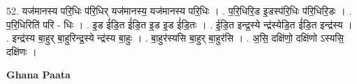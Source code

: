 \documentclass[17pt]{extarticle}
\begin{document}
52. यज॑मानस्य परि॒धिः प॑रि॒धिर् यज॑मानस्य॒ यज॑मानस्य परि॒धिः । . प॒रि॒धिरि॒ड इ॒डस्प॑रि॒धिः प॑रि॒धिरि॒डः । . प॒रि॒धिरिति॑ परि - धिः । . इ॒ड ई॑डि॒त ई॑डि॒त इ॒ड इ॒ड ई॑डि॒तः । . ई॒डि॒त इन्द्र॒स्ये न्द्र॑स्येडि॒त ई॑डि॒त इन्द्र॑स्य । . इन्द्र॑स्य बा॒हुर् बा॒हुरिन्द्र॒स्ये न्द्र॑स्य बा॒हुः । . बा॒हुर॑स्यसि बा॒हुर् बा॒हुर॑सि । . अ॒सि॒ दक्षि॑णो॒ दक्षि॑णो ऽस्यसि॒ दक्षि॑णः । \newline

\textbf{Ghana Paata } \newline
\end{document}
